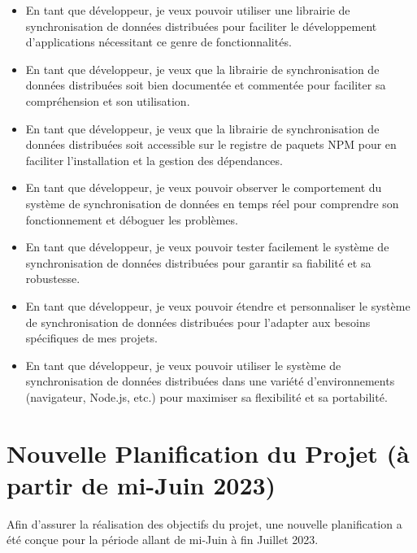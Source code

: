 \begin{itemize}
    \item En tant que développeur, je veux pouvoir utiliser une librairie de synchronisation de données distribuées pour faciliter le développement d'applications nécessitant ce genre de fonctionnalités.
    \item En tant que développeur, je veux que la librairie de synchronisation de données distribuées soit bien documentée et commentée pour faciliter sa compréhension et son utilisation.
    \item En tant que développeur, je veux que la librairie de synchronisation de données distribuées soit accessible sur le registre de paquets NPM pour en faciliter l'installation et la gestion des dépendances.
    \item En tant que développeur, je veux pouvoir observer le comportement du système de synchronisation de données en temps réel pour comprendre son fonctionnement et déboguer les problèmes.
    \item En tant que développeur, je veux pouvoir tester facilement le système de synchronisation de données distribuées pour garantir sa fiabilité et sa robustesse.
    \item En tant que développeur, je veux pouvoir étendre et personnaliser le système de synchronisation de données distribuées pour l'adapter aux besoins spécifiques de mes projets.
    \item En tant que développeur, je veux pouvoir utiliser le système de synchronisation de données distribuées dans une variété d'environnements (navigateur, Node.js, etc.) pour maximiser sa flexibilité et sa portabilité.
\end{itemize}

\section*{Nouvelle Planification du Projet (à partir de mi-Juin 2023)}

Afin d'assurer la réalisation des objectifs du projet, une nouvelle
planification a été conçue pour la période allant de mi-Juin à fin Juillet 2023.

